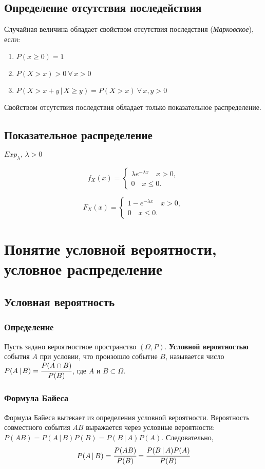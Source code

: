 \documentclass{article}
\begin{document}
\subsection{Определение отсутствия последействия}
Случайная величина обладает свойством отсутствия последствия (\textit{Марковское}), если:
\begin{enumerate}
    \item $P(x\geq0)=1$
    \item$P(X>x)>0\:\forall\,x>0$
    \item $P(X>x+y\,|\,X\geq y)=P(X>x)\:\forall\,x,y>0$
\end{enumerate}
Свойством отсутствия последствия обладает только показательное распределение.

\subsection{Показательное распределение}
$Exp_{\lambda},\,\lambda>0$

$$f_X(x)=\begin{cases}\lambda e^{-\lambda x}\quad x>0,\\0\quad x\leq 0.\end{cases}$$

$$F_X(x)=\begin{cases}1- e^{-\lambda x}\quad x>0,\\0\quad x\leq 0.\end{cases}$$
\newpage
\section{Понятие условной вероятности, условное распределение}
\subsection{Условная вероятность}
\subsubsection{Определение}
Пусть задано вероятностное пространство $(\Omega,P)$. \textbf{Условной вероятностью} события $A$ при условии, что произошло событие $B$, называется число $P(A\,|\,B)=\cfrac{P(A\cap B)}{P(B)}$, где $A$ и $B\subset\Omega$.
\subsubsection{Формула Байеса}
Формула Байеса вытекает из определения условной вероятности. Вероятность совместного события $AB$ выражается через условные вероятности: $P(AB)=P(A\,|\,B)P(B)=P(B\,|\,A)P(A)$. Следовательно, 
$$ P(A\,|\,B)=\cfrac{P(AB)}{P(B)}=\cfrac{P(B\,|\,A)P(A)}{P(B)} $$
\end{document}
